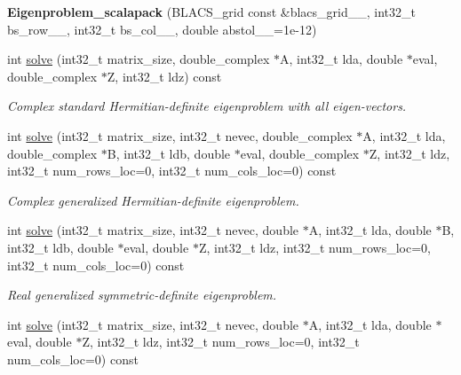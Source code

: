 \begin{DoxyCompactItemize}
\item 
\hypertarget{class_eigenproblem__scalapack_a968579623009618af1dc5620054eec81}{}{\bfseries Eigenproblem\+\_\+scalapack} (B\+L\+A\+C\+S\+\_\+grid const \&blacs\+\_\+grid\+\_\+\+\_\+, int32\+\_\+t bs\+\_\+row\+\_\+\+\_\+, int32\+\_\+t bs\+\_\+col\+\_\+\+\_\+, double abstol\+\_\+\+\_\+=1e-\/12)\label{class_eigenproblem__scalapack_a968579623009618af1dc5620054eec81}

\item 
int \hyperlink{class_eigenproblem__scalapack_ac8d647129c61f4eb167e05967aee7fbd}{solve} (int32\+\_\+t matrix\+\_\+size, double\+\_\+complex $\ast$A, int32\+\_\+t lda, double $\ast$eval, double\+\_\+complex $\ast$Z, int32\+\_\+t ldz) const 
\begin{DoxyCompactList}\small\item\em Complex standard Hermitian-\/definite eigenproblem with all eigen-\/vectors. \end{DoxyCompactList}\item 
int \hyperlink{class_eigenproblem__scalapack_ac9087b19c1e71903325ae44f616a2af2}{solve} (int32\+\_\+t matrix\+\_\+size, int32\+\_\+t nevec, double\+\_\+complex $\ast$A, int32\+\_\+t lda, double\+\_\+complex $\ast$B, int32\+\_\+t ldb, double $\ast$eval, double\+\_\+complex $\ast$Z, int32\+\_\+t ldz, int32\+\_\+t num\+\_\+rows\+\_\+loc=0, int32\+\_\+t num\+\_\+cols\+\_\+loc=0) const 
\begin{DoxyCompactList}\small\item\em Complex generalized Hermitian-\/definite eigenproblem. \end{DoxyCompactList}\item 
int \hyperlink{class_eigenproblem__scalapack_ab5913b0094853eafa35101301e33e175}{solve} (int32\+\_\+t matrix\+\_\+size, int32\+\_\+t nevec, double $\ast$A, int32\+\_\+t lda, double $\ast$B, int32\+\_\+t ldb, double $\ast$eval, double $\ast$Z, int32\+\_\+t ldz, int32\+\_\+t num\+\_\+rows\+\_\+loc=0, int32\+\_\+t num\+\_\+cols\+\_\+loc=0) const 
\begin{DoxyCompactList}\small\item\em Real generalized symmetric-\/definite eigenproblem. \end{DoxyCompactList}\item 
int \hyperlink{class_eigenproblem__scalapack_a12b54984209f8f32beb3d287aaae3ac9}{solve} (int32\+\_\+t matrix\+\_\+size, int32\+\_\+t nevec, double $\ast$A, int32\+\_\+t lda, double $\ast$eval, double $\ast$Z, int32\+\_\+t ldz, int32\+\_\+t num\+\_\+rows\+\_\+loc=0, int32\+\_\+t num\+\_\+cols\+\_\+loc=0) const 

\end{DoxyCompactItemize}
